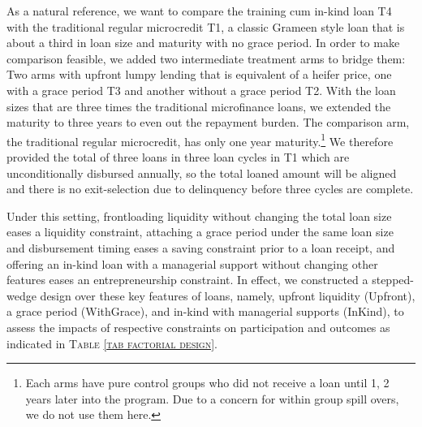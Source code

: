 	As a natural reference, we want to compare the training cum in-kind loan \textsf{T4} with the traditional regular microcredit \textsf{T1}, a classic Grameen style loan that is about a third in loan size and maturity with no grace period. In order to make comparison feasible, we added two intermediate treatment arms to bridge them: Two arms with upfront lumpy lending that is equivalent of a heifer price, one with a grace period \textsf{T3} and another without a grace period \textsf{T2}. With the loan sizes that are three times the traditional microfinance loans, we extended the maturity to three years to even out the repayment burden. The comparison arm, the traditional regular microcredit, has only one year maturity.\footnote{Each arms have pure control groups who did not receive a loan until 1, 2 years later into the program. Due to a concern for within group spill overs, we do not use them here. } We therefore provided the total of three loans in three loan cycles in \textsf{T1} which are unconditionally disbursed annually, so the total loaned amount will be aligned and there is no exit-selection due to delinquency before three cycles are complete. %
	
	Under this setting, frontloading liquidity without changing the total loan size eases a liquidity constraint, attaching a grace period under the same loan size and disbursement timing eases a saving constraint prior to a loan receipt, and offering an in-kind loan with a managerial support without changing other features eases an entrepreneurship constraint. In effect, we constructed a stepped-wedge design over these key features of loans, namely, upfront liquidity (\textsf{Upfront}), a grace period (\textsf{WithGrace}), and in-kind with managerial supports (\textsf{InKind}), to assess the impacts of respective constraints on participation and outcomes as indicated in \textsc{\normalsize Table \ref{tab factorial design}}. 

